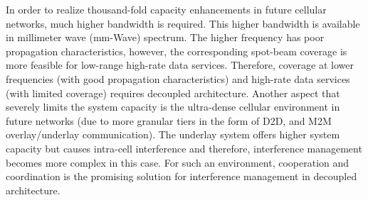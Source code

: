 \documentclass[article,10pt,twocolumn]{IEEEtran}
\begin{document}
In order to realize thousand-fold capacity enhancements in future cellular networks, much higher bandwidth is required. This higher bandwidth is available in millimeter wave (mm-Wave) spectrum. The higher frequency has poor propagation characteristics, however, the corresponding spot-beam coverage is more feasible for low-range high-rate data services. Therefore, coverage at lower frequencies (with good propagation characteristics) and high-rate data services (with limited coverage) requires decoupled architecture. Another aspect that severely limits the system capacity is the ultra-dense cellular environment in future networks (due to more granular tiers in the form of D2D, and M2M overlay/underlay communication). The underlay system offers higher system capacity but causes intra-cell interference and therefore, interference management becomes more complex in this case. For such an environment, cooperation and coordination is the promising solution for interference management in decoupled architecture. 
\end{document}
